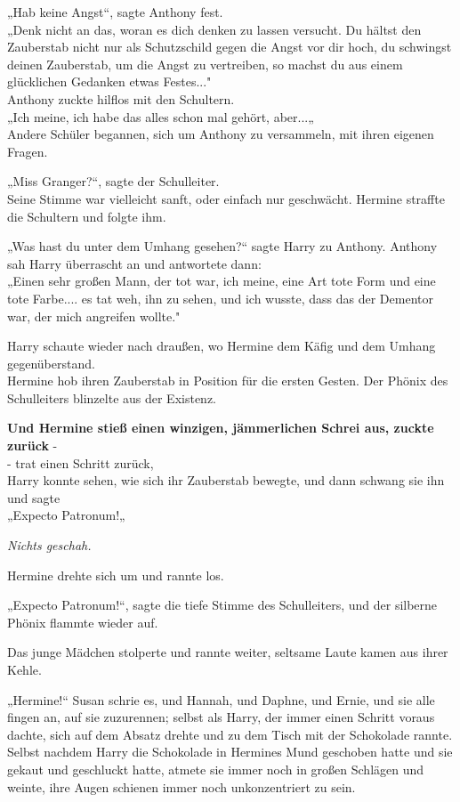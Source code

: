 {„Hab keine Angst“, sagte Anthony fest.\\ „Denk nicht an das, woran es dich denken zu lassen versucht. Du hältst den Zauberstab nicht nur als Schutzschild gegen die Angst vor dir hoch, du schwingst deinen Zauberstab, um die Angst zu vertreiben, so machst du aus einem glücklichen Gedanken etwas Festes..."\\ Anthony zuckte hilflos mit den Schultern.\\ „Ich meine, ich habe das alles schon mal gehört, aber...„\\ Andere Schüler begannen, sich um Anthony zu versammeln, mit ihren eigenen Fragen.

„Miss Granger?“, sagte der Schulleiter.\\ Seine Stimme war vielleicht sanft, oder einfach nur geschwächt. Hermine straffte die Schultern und folgte ihm.

„Was hast du unter dem Umhang gesehen?“ sagte Harry zu Anthony. Anthony sah Harry überrascht an und antwortete dann:\\ „Einen sehr großen Mann, der tot war, ich meine, eine Art tote Form und eine tote Farbe.... es tat weh, ihn zu sehen, und ich wusste, dass das der Dementor war, der mich angreifen wollte."

Harry schaute wieder nach draußen, wo Hermine dem Käfig und dem Umhang gegenüberstand.\\ Hermine hob ihren Zauberstab in Position für die ersten Gesten. Der Phönix des Schulleiters blinzelte aus der Existenz.

\textbf{Und Hermine stieß einen winzigen, jämmerlichen Schrei aus, zuckte zurück} -\\ - trat einen Schritt zurück,\\ Harry konnte sehen, wie sich ihr Zauberstab bewegte, und dann schwang sie ihn und sagte\\ „Expecto Patronum!„

\emph{Nichts geschah.}

Hermine drehte sich um und rannte los.

„Expecto Patronum!“, sagte die tiefe Stimme des Schulleiters, und der silberne Phönix flammte wieder auf.

Das junge Mädchen stolperte und rannte weiter, seltsame Laute kamen aus ihrer Kehle.

„Hermine!“ Susan schrie es, und Hannah, und Daphne, und Ernie, und sie alle fingen an, auf sie zuzurennen; selbst als Harry, der immer einen Schritt voraus dachte, sich auf dem Absatz drehte und zu dem Tisch mit der Schokolade rannte. Selbst nachdem Harry die Schokolade in Hermines Mund geschoben hatte und sie gekaut und geschluckt hatte, atmete sie immer noch in großen Schlägen und weinte, ihre Augen schienen immer noch unkonzentriert zu sein.

}
